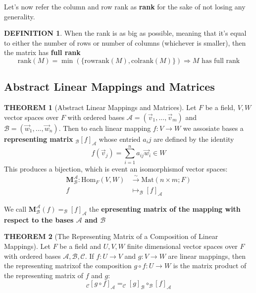 \documentclass[12pt]{article}
\theoremstyle{definition}
\newtheorem{definition}{DEFINITION}[subsection]
\newtheorem{theorem}{THEOREM}[subsection]
\newcommand{\Hom}{\text{Hom}}
\newcommand{\Mat}{\text{Mat}}
\begin{document}
Let's now refer the column and row rank as \textbf{rank} for the sake of not losing any generality.

\begin{definition}
    When the rank is as big as possible, meaning that it's equal to either the number of rows or number of columns (whichever is smaller), then the matrix has \textbf{full rank}
    \[
        \text{rank}(M) = \min(\{\text{rowrank}(M), \text{colrank}(M)\}) \Rightarrow M \text{ has full rank}
    \]
\end{definition}

\subsection{Abstract Linear Mappings and Matrices}
\begin{theorem}[Abstract  Linear  Mappings  and  Matrices]
    Let $F$ be a field, $V,W$ vector spaces over $F$ with ordered bases $\mathcal{A} = (\vec{v}_1,...,\vec{v}_m)$ and $\mathcal{B} = (\vec{w}_1,...,\vec{w}_n)$. Then to each linear mapping $f:V\rightarrow W$ we assosiate bases a \textbf{representing matrix} $_\mathcal{B}[f]_\mathcal{A}$ whose entried $a_ij$ are defined by the identity $$f(\vec{v}_j) = \sum_{i=1}^n{a_{ij}\vec{w}_i}\in W$$
    This produces a bijection, which is event an isomorphismof vector spaces:
    \[\begin{split}
        \textbf{M}_\mathcal{B}^\mathcal{A}: \Hom_F(V,W) &\stackrel{\sim}{\rightarrow} \Mat(n \times m; F)\\
        f &\mapsto _\mathcal{B}[f]_\mathcal{A} 
    \end{split}\]
\end{theorem}
We call $\textbf{M}_\mathcal{B}^\mathcal{A}(f) = _\mathcal{B}[f]_\mathcal{A}$ the \textbf{epresenting matrix of the mapping with respect to the bases $\mathcal{A}$ and $\mathcal{B}$}

\begin{theorem}[The Representing Matrix of a Composition of Linear Mappings]
    Let $F$ be a field and $U,V,W$ finite dimensional vector spaces over $F$ with ordered bases $\mathcal{A,B,C}$. If $f:U\rightarrow V$ and $g:V \rightarrow W$ are linear mappings, then the representing matrixof the composition $g \circ f: U \rightarrow W$ is the matrix product of the representing matrix of $f$ and $g$: $$_\mathcal{C}[g\circ f]_\mathcal{A} = _\mathcal{C}[g]_\mathcal{B} \circ _\mathcal{B}[f]_\mathcal{A}$$
\end{theorem}
\end{document}
